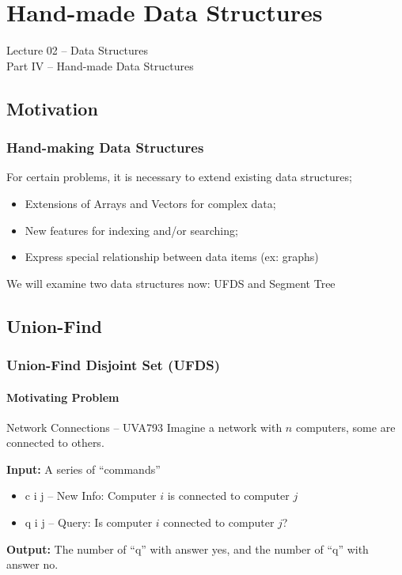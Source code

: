 \section{Hand-made Data Structures}
\begin{frame}
  \begin{center}
    {\large Lecture 02 -- Data Structures\\Part IV -- Hand-made Data Structures}\\
  \end{center}
\end{frame}

\subsection{Motivation}
\begin{frame}
  \frametitle{Hand-making Data Structures}

  \begin{block}{}
    For certain problems, it is necessary to extend existing data structures;
  \end{block}

  \begin{itemize}
    \item Extensions of Arrays and Vectors for complex data;
    \bigskip

    \item New features for indexing and/or searching;
    \bigskip

    \item Express special relationship between data items (ex: graphs)
  \end{itemize}

  We will examine two data structures now: UFDS and Segment Tree
\end{frame}

\subsection{Union-Find}
\begin{frame}
  \frametitle{Union-Find Disjoint Set (UFDS)}
  \framesubtitle{Motivating Problem}

  \begin{block}{Network Connections -- UVA793}
    Imagine a network with $n$ computers, some are connected to others.
    \bigskip

    {\bf Input:} A series of ``commands''
    \begin{itemize}
    \item c i j -- New Info: Computer $i$ is connected to computer $j$
    \item q i j -- Query: Is computer $i$ connected to computer $j$?
    \end{itemize}

    \bigskip
    {\bf Output:} The number of ``q'' with answer yes, and the number
    of ``q'' with answer no.
  \end{block}
\end{frame}

